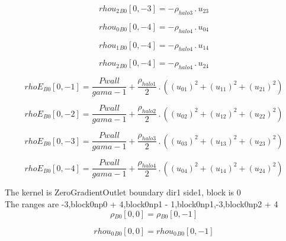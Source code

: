 \documentclass{article}
\begin{document}
\begin{dmath}{rhou_{2}{_{B0}}}[{0,-3}] = - \rho_{halo 3} \,.\, u_{23}\end{dmath}

\begin{dmath}{rhou_{0}{_{B0}}}[{0,-4}] = - \rho_{halo 4} \,.\, u_{04}\end{dmath}

\begin{dmath}{rhou_{1}{_{B0}}}[{0,-4}] = - \rho_{halo 4} \,.\, u_{14}\end{dmath}

\begin{dmath}{rhou_{2}{_{B0}}}[{0,-4}] = - \rho_{halo 4} \,.\, u_{24}\end{dmath}

\begin{dmath}{rhoE{_{B0}}}[{0,-1}] = \frac{Pwall}{gama - 1} + \frac{\rho_{halo 1}}{2} \,.\, \left(\left(u_{01} \right)^{2} + \left(u_{11} \right)^{2} + \left(u_{21} \right)^{2}\right)\end{dmath}

\begin{dmath}{rhoE{_{B0}}}[{0,-2}] = \frac{Pwall}{gama - 1} + \frac{\rho_{halo 2}}{2} \,.\, \left(\left(u_{02} \right)^{2} + \left(u_{12} \right)^{2} + \left(u_{22} \right)^{2}\right)\end{dmath}

\begin{dmath}{rhoE{_{B0}}}[{0,-3}] = \frac{Pwall}{gama - 1} + \frac{\rho_{halo 3}}{2} \,.\, \left(\left(u_{03} \right)^{2} + \left(u_{13} \right)^{2} + \left(u_{23} \right)^{2}\right)\end{dmath}

\begin{dmath}{rhoE{_{B0}}}[{0,-4}] = \frac{Pwall}{gama - 1} + \frac{\rho_{halo 4}}{2} \,.\, \left(\left(u_{04} \right)^{2} + \left(u_{14} \right)^{2} + \left(u_{24} \right)^{2}\right)\end{dmath}

\noindent The kernel is ZeroGradientOutlet boundary dir1 side1, block is 0\\\noindent The ranges are -3,block0np0 + 4,block0np1 - 1,block0np1,-3,block0np2 + 4\\\begin{dmath}{\rho{_{B0}}}[{0,0}] = {\rho{_{B0}}}[{0,-1}]\end{dmath}

\begin{dmath}{rhou_{0}{_{B0}}}[{0,0}] = {rhou_{0}{_{B0}}}[{0,-1}]\end{dmath}
\end{document}
